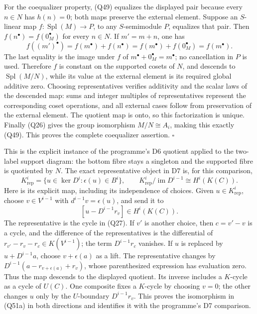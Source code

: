 \documentclass[
]{article}
\begin{document}
For the coequalizer property, (Q49) equalizes the displayed pair because
every \(n\in N\) has \(h(n)=0\); both maps preserve the external
element. Suppose an \(S\)-linear map \(f:\operatorname{Spl}(M)\to P\),
to any \(S\)-semimodule \(P\), equalizes that pair. Then
\(f(n^\bullet)=f(0_M^\bullet)\) for every \(n\in N\). If \(m'=m+n\), one
has \[
f((m')^\bullet)
=f(m^\bullet)+f(n^\bullet)
=f(m^\bullet)+f(0_M^\bullet)
=f(m^\bullet).
\tag{Q51}
\] The last equality is the image under \(f\) of
\(m^\bullet+0_M^\bullet=m^\bullet\); no cancellation in \(P\) is used.
Therefore \(f\) is constant on the supported cosets of \(N\), and
descends to \(\operatorname{Spl}(M/N)\), while its value at the external
element is its required global additive zero. Choosing representatives
verifies additivity and the scalar laws of the descended map: sums and
integer multiples of representatives represent the corresponding coset
operations, and all external cases follow from preservation of the
external element. The quotient map is onto, so this factorization is
unique. Finally (Q26) gives the group isomorphism \(M/N\cong A_i\),
making this exactly (Q49). This proves the complete coequalizer
assertion. \(\square\)

This is the explicit instance of the programme's D6 quotient applied to
the two-label support diagram: the bottom fibre stays a singleton and
the supported fibre is quotiented by \(N\). The exact representative
object in D7 is, for this comparison, \[
K_{\mathrm{rep}}^i=
\{u\in\ker D^i:\epsilon(u)\in B^i\},
\qquad
K_{\mathrm{rep}}^i/\operatorname{im}D^{i-1}
\cong H^i(K(C)).
\tag{Q51a}
\] Here is its explicit map, including its independence of choices.
Given \(u\in K_{\mathrm{rep}}^i\), choose \(v\in V^{i-1}\) with
\(d^{i-1}v=\epsilon(u)\), and send it to \[
[u-D^{i-1}r_v]\in H^i(K(C)).
\tag{Q51b}
\] The representative is the cycle in (Q27). If \(v'\) is another
choice, then \(c=v'-v\) is a cycle, and the difference of the
representatives is the differential of \(r_{v'}-r_v-r_c\in K(V^{i-1})\);
the term \(D^{i-1}r_c\) vanishes. If \(u\) is replaced by
\(u+D^{i-1}a\), choose \(v+\epsilon(a)\) as a lift. The representative
changes by \(D^{i-1}(a-r_{v+\epsilon(a)}+r_v)\), whose parenthesized
expression has evaluation zero. Thus the map descends to the displayed
quotient. Its inverse includes a \(K\)-cycle as a cycle of \(U(C)\). One
composite fixes a \(K\)-cycle by choosing \(v=0\); the other changes
\(u\) only by the \(U\)-boundary \(D^{i-1}r_v\). This proves the
isomorphism in (Q51a) in both directions and identifies it with the
programme's D7 comparison.
\end{document}
